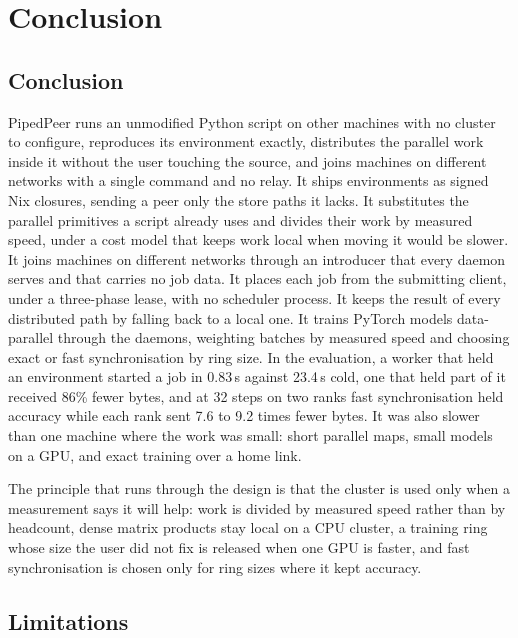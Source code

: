 \chapter{Conclusion}
\label{chap:conclusion}

\section{Conclusion}

PipedPeer runs an unmodified Python script on other machines with no cluster to
configure, reproduces its environment exactly, distributes the parallel work
inside it without the user touching the source, and joins machines on different
networks with a single command and no relay. It ships environments as signed
Nix closures, sending a peer only the store paths it lacks. It substitutes the
parallel primitives a script already uses and divides their work by measured
speed, under a cost model that keeps work local when moving it would be slower.
It joins machines on different networks through an introducer that every daemon
serves and that carries no job data. It places each job from the submitting
client, under a three-phase lease, with no scheduler process. It keeps the
result of every distributed path by falling back to a local one. It trains
PyTorch models data-parallel through the daemons, weighting batches by measured
speed and choosing exact or fast synchronisation by ring size. In the evaluation, a worker that held an
environment started a job in 0.83\,s against 23.4\,s cold, one that held part
of it received 86\% fewer bytes, and at 32 steps on two ranks fast
synchronisation held accuracy while each rank sent 7.6 to 9.2 times fewer bytes.
It was also slower than one machine where the work was small: short parallel
maps, small models on a GPU, and exact training over a home link.

The principle that runs through the design is that the cluster is used only when
a measurement says it will help: work is divided by measured speed rather than
by headcount, dense matrix products stay local on a CPU cluster, a training ring
whose size the user did not fix is released when one GPU is faster, and fast
synchronisation is chosen only for ring sizes where it kept accuracy.

\section{Limitations}

